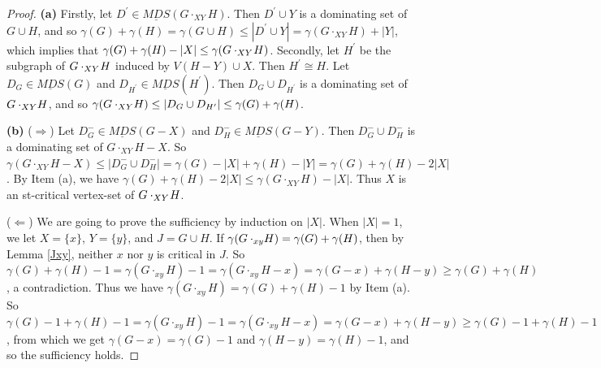 \documentclass[a4paper,11pt]{article}
\numberwithin{equation}{section}
\begin{document}
\begin{proof}
\textbf{(a)} Firstly, let $D^{\prime}\in \underline{MDS}(G\cdot_{XY}H)$. Then $D^{\prime}\cup Y$ is a dominating set of $G\cup H$, and so $\gamma(G)+\gamma(H)=\gamma(G\cup H)\leq|D^{\prime}\cup Y|=\gamma(G\cdot_{XY}H)+|Y|$, which implies that $\gamma(G)+\gamma(H)-|X|\leq\gamma(G\cdot_{XY}\negthinspace H)$. Secondly, let $H^{\prime}$ be the subgraph of $G\cdot_{XY}\negthinspace H$ induced by $V(H-Y)\cup X$. Then $H^{\prime}\cong H$. Let $D_G\in\underline{MDS}(G)$ and $D_{H^{\prime}}\in\underline{MDS}(H^{\prime})$. Then $D_G\cup D_{H^{\prime}}$ is a dominating set of $G\cdot_{XY}\negmedspace H$, and so $\gamma(G\cdot_{XY}\negmedspace H)\leq|D_G\cup D_{H^{\prime}}|\leq\gamma(G)+\gamma(H)$.

\smallskip
\textbf{(b)} ($\Rightarrow$) Let $D_G^{-}\in \underline{MDS}(G-X)$ and $D_H^{-}\in \underline{MDS}(G-Y)$. Then $D_G^{-} \cup D_H^{-}$ is a dominating set of $G\cdot_{XY}H-X$. So $\gamma(G\cdot_{XY}H-X)\leq|D_G^{-} \cup D_H^{-}|=\gamma(G)-|X|+\gamma(H)-|Y|=\gamma(G)+\gamma(H)-2|X|$. By Item (a), we have $\gamma(G)+\gamma(H)-2|X|\leq\gamma(G\cdot_{XY}H)-|X|$. Thus $X$ is an st-critical vertex-set of $G\cdot_{XY}\negthinspace H$.

($\Leftarrow$)
We are going to prove the sufficiency by induction on $|X|$. When $|X|=1$, we let $X=\{x\}$, $Y=\{y\}$, and $J=G\cup H$. If $\gamma(G\cdot_{xy}\negmedspace H)=\gamma(G)+\gamma(H)$,  then by Lemma \ref{Jxy}, neither $x$ nor $y$ is critical in $J$. So $\gamma(G)+\gamma(H)-1=\gamma(G\cdot_{xy}H)-1=\gamma(G\cdot_{xy}H-x)=\gamma(G-x)+\gamma(H-y)\geq\gamma(G)+\gamma(H)$, a contradiction. Thus we have $\gamma(G\cdot_{xy}H)=\gamma(G)+\gamma(H)-1$ by Item (a). So $\gamma(G)-1+\gamma(H)-1=\gamma(G\cdot_{xy}H)-1=\gamma(G\cdot_{xy}H-x)=\gamma(G-x)+\gamma(H-y)\geq\gamma(G)-1+\gamma(H)-1$, from which we get $\gamma(G-x)=\gamma(G)-1$ and $\gamma(H-y)=\gamma(H)-1$, and so the sufficiency holds.


\end{proof}
\end{document}
